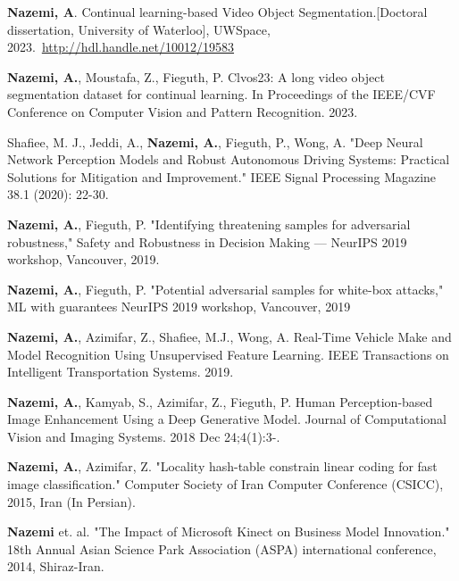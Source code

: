 \documentclass[letterpaper,11pt]{article}
\begin{document}
    \item {\textbf {Nazemi, A}. Continual learning-based Video Object Segmentation.[Doctoral dissertation, University of Waterloo], UWSpace, 2023.~\href{http://hdl.handle.net/10012/19583}{\underline{http://hdl.handle.net/10012/19583}}}

    \item{\textbf {Nazemi, A.}, Moustafa, Z., Fieguth, P. Clvos23: A long video object segmentation dataset for continual learning. In Proceedings of the IEEE/CVF Conference on Computer Vision and Pattern Recognition. 2023.}

    \item{Shafiee, M. J., Jeddi, A., \textbf {Nazemi, A.}, Fieguth, P., Wong, A. "Deep Neural Network Perception Models and Robust Autonomous Driving Systems: Practical Solutions for Mitigation and Improvement." IEEE Signal Processing Magazine 38.1 (2020): 22-30.}

    \item{\textbf {Nazemi, A.}, Fieguth, P. "Identifying threatening samples for adversarial robustness," Safety and Robustness in Decision Making — NeurIPS 2019 workshop, Vancouver, 2019.}

    \item{\textbf {Nazemi, A.}, Fieguth, P. "Potential adversarial samples for white-box attacks," ML with guarantees NeurIPS 2019 workshop, Vancouver, 2019}

    \item{\textbf {Nazemi, A.}, Azimifar, Z., Shafiee, M.J., Wong, A. Real-Time Vehicle Make and Model Recognition Using Unsupervised Feature Learning. IEEE Transactions on Intelligent Transportation Systems. 2019.}

    \item{\textbf {Nazemi, A.}, Kamyab, S., Azimifar, Z., Fieguth, P. Human Perception-based Image Enhancement Using a Deep Generative Model. Journal of Computational Vision and Imaging Systems. 2018 Dec 24;4(1):3-.}

    \item{\textbf {Nazemi, A.}, Azimifar, Z. "Locality hash-table constrain linear coding for fast image classification." Computer Society of Iran Computer Conference (CSICC), 2015, Iran (In Persian).}

    \item{\textbf {Nazemi} et. al. "The Impact of Microsoft Kinect on Business Model Innovation." 18th Annual Asian Science Park Association (ASPA) international conference, 2014, Shiraz-Iran.}
\end{document}
